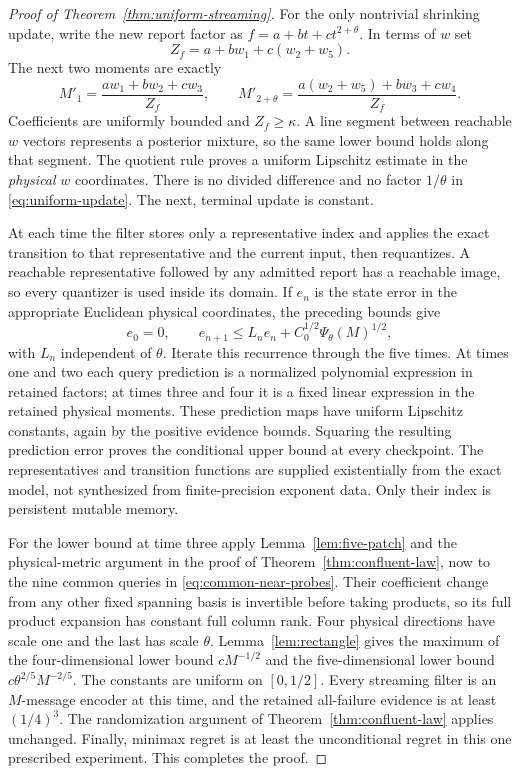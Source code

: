 \documentclass[11pt]{amsart}
\theoremstyle{definition}\newtheorem{definition}[theorem]{Definition}
\theoremstyle{remark}\newtheorem{remark}[theorem]{Remark}
\begin{document}
\begin{proof}[Proof of Theorem~\ref{thm:uniform-streaming}]
For the only nontrivial shrinking update, write the new report factor as
$f=a+bt+ct^{2+\theta}$. In terms of $w$ set
\[
 Z_f=a+bw_1+c(w_2+w_5).
\]
The next two moments are exactly
\begin{equation}\label{eq:uniform-update}
 M'_1=\frac{aw_1+bw_2+cw_3}{Z_f},\qquad
 M'_{2+\theta}=\frac{a(w_2+w_5)+bw_3+cw_4}{Z_f}.
\end{equation}
Coefficients are uniformly bounded and $Z_f\ge\kappa$. A line segment
between reachable $w$ vectors represents a posterior mixture, so the
same lower bound holds along that segment. The quotient rule proves a
uniform Lipschitz estimate in the \emph{physical} $w$ coordinates.
There is no divided difference and no factor $1/\theta$ in
\eqref{eq:uniform-update}. The next, terminal update is constant.

At each time the filter stores only a representative index and applies
the exact transition to that representative and the current input, then
requantizes. A reachable representative followed by any admitted report
has a reachable image, so every quantizer is used inside its domain.
If $e_n$ is the state error in the appropriate Euclidean physical
coordinates, the preceding bounds give
\[
 e_0=0,\qquad e_{n+1}\le L_ne_n+C_0^{1/2}\Psi_\theta(M)^{1/2},
\]
with $L_n$ independent of $\theta$. Iterate this recurrence through the
five times. At times one and two each query prediction is a normalized
polynomial expression in retained factors; at times three and four it
is a fixed linear expression in the retained physical moments. These
prediction maps have uniform Lipschitz constants, again by the positive
evidence bounds. Squaring the resulting prediction error proves the
conditional upper bound at every checkpoint. The representatives and
transition functions are supplied existentially from the exact model,
not synthesized from finite-precision exponent data. Only their index is
persistent mutable memory.

For the lower bound at time three apply
Lemma~\ref{lem:five-patch} and the physical-metric argument in the proof
of Theorem~\ref{thm:confluent-law}, now to the nine common queries in
\eqref{eq:common-near-probes}. Their coefficient change from any other
fixed spanning basis is invertible before taking products, so its full
product expansion has constant full column rank. Four physical directions
have scale one and the last has scale $\theta$. Lemma~\ref{lem:rectangle}
gives the maximum of the four-dimensional lower bound $cM^{-1/2}$ and
the five-dimensional lower bound $c\theta^{2/5}M^{-2/5}$. The constants
are uniform on $[0,1/2]$. Every streaming filter is an $M$-message encoder
at this time, and the retained all-failure evidence is at least $(1/4)^3$.
The randomization argument of Theorem~\ref{thm:confluent-law} applies
unchanged. Finally, minimax regret is at least the unconditional regret
in this one prescribed experiment. This completes the proof.
\end{proof}
\end{document}
